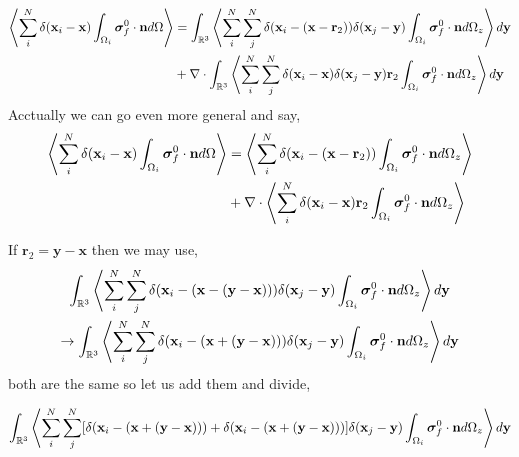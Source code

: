 \documentclass[12pt]{My_preprint}
\begin{document}
\begin{align*}
    \avg{\sum_i^N  \delta(\textbf{x}_i - \textbf{x}) \intO[i]{\bm\sigma_f^0 \cdot \textbf{n}}}
    &= 
    \int_{\mathbb{R}^3} 
    \avg{
        \sum_i^N 
        \sum_j^N 
        \delta(\textbf{x}_i - (\textbf{x} - \textbf{r}_2)) 
        \delta(\textbf{x}_j - \textbf{y}) 
        \intO[i]{\bm\sigma_f^0 \cdot \textbf{n}}_z
        }
        d\textbf{y}\\
    &+ 
    \div 
    \int_{\mathbb{R}^3} 
    \avg{
        \sum_i^N 
        \sum_j^N 
        \delta(\textbf{x}_i - \textbf{x}) 
        \delta(\textbf{x}_j - \textbf{y}) 
        \textbf{r}_2
        \intO[i]{\bm\sigma_f^0 \cdot \textbf{n}}_z
        }
        d\textbf{y}
\end{align*}
Acctually we can go even more general and say, 
\begin{align*}
    \avg{\sum_i^N  \delta(\textbf{x}_i - \textbf{x}) \intO[i]{\bm\sigma_f^0 \cdot \textbf{n}}}
    &= 
    \avg{
        \sum_i^N 
        \delta(\textbf{x}_i - (\textbf{x} - \textbf{r}_2)) 
        \intO[i]{\bm\sigma_f^0 \cdot \textbf{n}}_z
        }\\
    &+ 
    \div 
    \avg{
        \sum_i^N 
        \delta(\textbf{x}_i - \textbf{x}) 
        \textbf{r}_2
        \intO[i]{\bm\sigma_f^0 \cdot \textbf{n}}_z
        }
\end{align*}

If $\textbf{r}_2 = \textbf{y} - \textbf{x}$ then we may use, 
\begin{multline}
    \int_{\mathbb{R}^3} 
    \avg{
        \sum_i^N 
        \sum_j^N 
        \delta(\textbf{x}_i - (\textbf{x} - (\textbf{y} -  \textbf{x}))) 
        \delta(\textbf{x}_j - \textbf{y}) 
        \intO[i]{\bm\sigma_f^0 \cdot \textbf{n}}_z
        }
        d\textbf{y}\\
        \to
        \int_{\mathbb{R}^3} 
        \avg{
            \sum_i^N 
            \sum_j^N 
            \delta(\textbf{x}_i - (\textbf{x} + (\textbf{y} -  \textbf{x})) )
            \delta(\textbf{x}_j - \textbf{y}) 
            \intO[i]{\bm\sigma_f^0 \cdot \textbf{n}}_z
            }
            d\textbf{y}
\end{multline}
both are the same so let us add them and divide, 

\begin{equation}
    \int_{\mathbb{R}^3} 
    \avg{
        \sum_i^N 
        \sum_j^N 
        [\delta(\textbf{x}_i - (\textbf{x} + (\textbf{y} -  \textbf{x})) )
         + \delta(\textbf{x}_i - (\textbf{x} + (\textbf{y} -  \textbf{x})) )]
        \delta(\textbf{x}_j - \textbf{y}) 
        \intO[i]{\bm\sigma_f^0 \cdot \textbf{n}}_z
        }
        d\textbf{y}
\end{equation}
\end{document}
